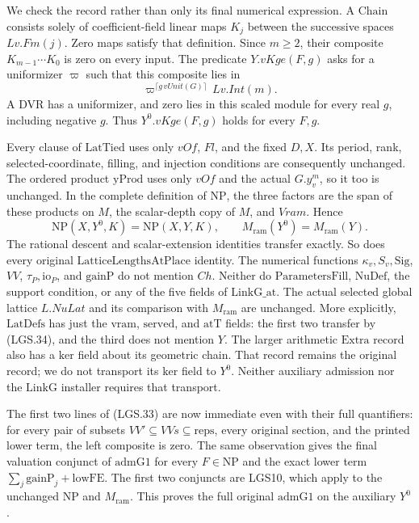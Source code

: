 We check the record rather than only its final numerical
expression.  A \(\mathrm{Chain}\) consists solely of
coefficient-field linear maps \(K_j\) between the
successive spaces \(Lv.Fm(j)\).  Zero maps satisfy that
definition.  Since \(m\ge2\), their composite
\(K_{m-1}\cdots K_0\) is zero on every input.
The predicate \(Y.vKge(F,g)\) asks for a uniformizer
\(\varpi\) such that this composite lies in
\[
 \varpi^{\lceil g\,vUnit(G)\rceil}\,Lv.Int(m).
 \]
A DVR has a uniformizer, and zero lies in this scaled
module for every real \(g\), including negative \(g\).
Thus \(Y^0.vKge(F,g)\) holds for every \(F,g\).

Every clause of \(\mathrm{LatTied}\) uses only \(vOf\),
\(Fl\), and the fixed \(D,X\).  Its period, rank,
selected-coordinate, filling, and injection conditions
are consequently unchanged.  The ordered product
\(\mathrm{yProd}\) uses only \(vOf\) and the actual
\(G.y_v^m\), so it too is unchanged.  In the complete
definition of \(\mathrm{NP}\), the three factors are
the span of these products on \(M\), the scalar-depth
copy of \(M\), and \(Vram\).  Hence
\[
 \mathrm{NP}(X,Y^0,K)=\mathrm{NP}(X,Y,K),\qquad
 M_{\mathrm{ram}}(Y^0)=M_{\mathrm{ram}}(Y).             \tag{LGS.34}
\]
The rational descent and scalar-extension identities
transfer exactly.  So does every original
\(\mathrm{LatticeLengthsAtPlace}\) identity.  The numerical
functions \(\kappa_v,S_v,\mathrm{Sig}\), \(VV\),
\(\tau_P,\mathrm{io}_P\), and \(\mathrm{gainP}\)
do not mention \(Ch\).
Neither do \(\mathrm{ParametersFill}\),
\(\mathrm{NuDef}\), the support condition, or any of
the five fields of \(\mathrm{LinkG\_at}\).
The actual selected global lattice \(L.NuLat\) and
its comparison with \(M_{\mathrm{ram}}\) are unchanged.
More explicitly, \(\mathrm{LatDefs}\) has just the
\(\mathrm{vram}\), \(\mathrm{served}\), and
\(\mathrm{atT}\) fields: the first two transfer by
(LGS.34), and the third does not mention \(Y\).
The larger arithmetic \(\mathrm{Extra}\) record
also has a \(\mathrm{ker}\) field about its geometric
chain.  That record remains the original record;
we do not transport its \(\mathrm{ker}\) field to
\(Y^0\).  Neither auxiliary admission nor the
\(\mathrm{LinkG}\) installer requires that transport.

The first two lines of (LGS.33) are now immediate even
with their full quantifiers: for every pair of subsets
\(VV'\subseteq VVs\subseteq\mathrm{reps}\), every
original section, and the printed lower term, the
left composite is zero.  The same observation gives
the final valuation conjunct of \(\mathrm{admG1}\)
for every \(F\in\mathrm{NP}\) and the exact lower term
\(\sum_j\mathrm{gainP}_j+\mathrm{lowFE}\).
The first two conjuncts are LGS10, which apply to the
unchanged \(\mathrm{NP}\) and \(M_{\mathrm{ram}}\).
This proves the full original \(\mathrm{admG1}\) on
the auxiliary \(Y^0\).

